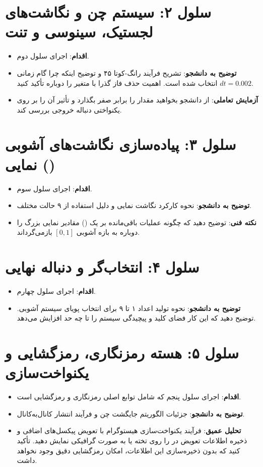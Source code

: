 \section{سلول ۲: سیستم چن و نگاشت‌های لجستیک، سینوسی و تنت}
\begin{itemize}
    \item \textbf{اقدام}: اجرای سلول دوم.
    \item \textbf{توضیح به دانشجو}: تشریح فرآیند رانگ-کوتا ۴۵ و توضیح اینکه چرا گام زمانی $dt=0.002$ انتخاب شده است. اهمیت حذف فاز گذرا با متغیر \texttt{} را دوباره تأکید کنید.
    \item \textbf{آزمایش تعاملی}: از دانشجو بخواهید مقدار \texttt{} را برابر صفر بگذارد و تأثیر آن را بر روی یکنواختی دنباله خروجی بررسی کند.
\end{itemize}

\section{سلول ۳: پیاده‌سازی نگاشت‌های آشوبی نمایی ()}
\begin{itemize}
    \item \textbf{اقدام}: اجرای سلول سوم.
    \item \textbf{توضیح به دانشجو}: نحوه کارکرد نگاشت نمایی و دلیل استفاده از ۹ حالت مختلف.
    \item \textbf{نکته فنی}: توضیح دهید که چگونه عملیات باقی‌مانده بر یک () مقادیر نمایی بزرگ را دوباره به بازه آشوبی $[0, 1]$ بازمی‌گرداند.
\end{itemize}

\section{سلول ۴: انتخاب‌گر و دنباله نهایی}
\begin{itemize}
    \item \textbf{اقدام}: اجرای سلول چهارم.
    \item \textbf{توضیح به دانشجو}: نحوه تولید اعداد ۱ تا ۹ برای انتخاب پویای سیستم آشوبی. توضیح دهید که این کار فضای کلید و پیچیدگی سیستم را تا چه حد افزایش می‌دهد.
\end{itemize}

\section{سلول ۵: هسته رمزنگاری، رمزگشایی و یکنواخت‌سازی}
\begin{itemize}
    \item \textbf{اقدام}: اجرای سلول پنجم که شامل توابع اصلی رمزنگاری و رمزگشایی است.
    \item \textbf{توضیح به دانشجو}: جزئیات الگوریتم جایگشت چن و فرآیند انتشار  کانال‌به‌کانال.
    \item \textbf{تحلیل عمیق}: فرآیند یکنواخت‌سازی هیستوگرام با تعویض پیکسل‌های اضافی و ذخیره اطلاعات تعویض در \texttt{} را روی تخته یا به صورت گرافیکی نمایش دهید. تأکید کنید که بدون ذخیره‌سازی این اطلاعات، امکان رمزگشایی دقیق وجود نخواهد داشت.
\end{itemize}

